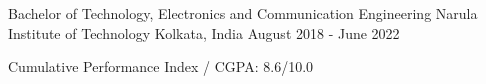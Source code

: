 

  \cventry
    {Bachelor of Technology, Electronics and Communication Engineering}
    {Narula Institute of Technology}
    {Kolkata, India}
    {August 2018 - June 2022}
    {
      \begin{cvitems}
        \item Cumulative Performance Index / CGPA: 8.6/10.0
      \end{cvitems}
    }

